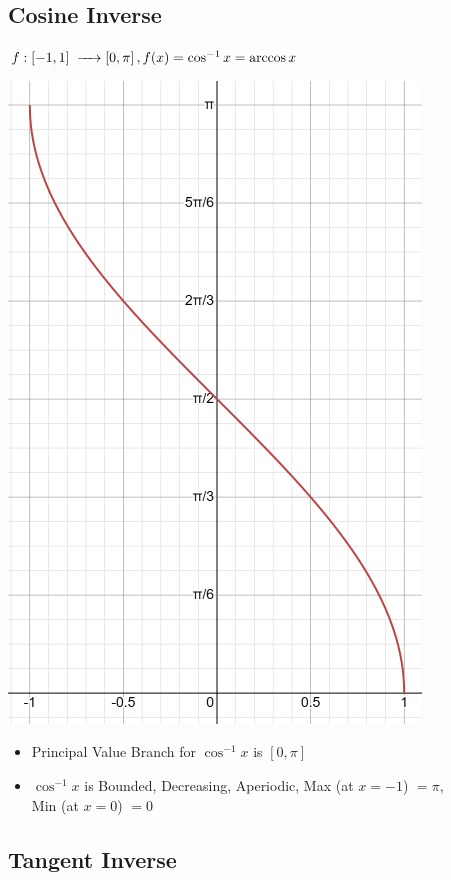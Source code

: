 \documentclass{article}
\begin{document}
\subsection{Cosine Inverse}

$f : [-1,1] \hspace{1mm} \xrightarrow{\hspace{4mm}} \left[0,\pi\right], f(x)=\cos^{-1} x = \arccos x$

\begin{center}
    \includegraphics[scale=0.7]{graph_2.png}
\end{center}
\begin{itemize}
    \item Principal Value Branch for $\cos ^{-1} x$ is $\left[0,\pi\right]$
    \item $\cos^{-1}x$ is Bounded, Decreasing, Aperiodic, Max (at $x=-1$) $=\pi$, 
    \\Min (at $x=0$) $=0$
\end{itemize}
\newpage

\subsection{Tangent Inverse}
\end{document}
